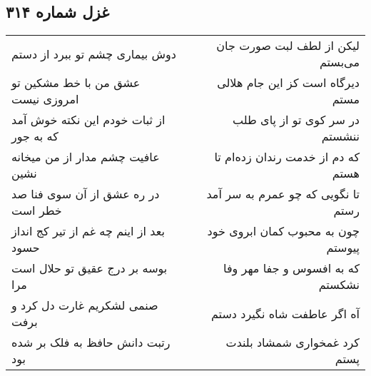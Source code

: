 \begin{center}
\section*{غزل شماره ۳۱۴}
\label{sec:sh314}
\begin{longtable}{l p{0.5cm} r}
دوش بیماری چشم تو ببرد از دستم
&&
لیکن از لطف لبت صورت جان می‌بستم
\\
عشق من با خط مشکین تو امروزی نیست
&&
دیرگاه است کز این جام هلالی مستم
\\
از ثبات خودم این نکته خوش آمد که به جور
&&
در سر کوی تو از پای طلب ننشستم
\\
عافیت چشم مدار از من میخانه نشین
&&
که دم از خدمت رندان زده‌ام تا هستم
\\
در ره عشق از آن سوی فنا صد خطر است
&&
تا نگویی که چو عمرم به سر آمد رستم
\\
بعد از اینم چه غم از تیر کج انداز حسود
&&
چون به محبوب کمان ابروی خود پیوستم
\\
بوسه بر درج عقیق تو حلال است مرا
&&
که به افسوس و جفا مهر وفا نشکستم
\\
صنمی لشکریم غارت دل کرد و برفت
&&
آه اگر عاطفت شاه نگیرد دستم
\\
رتبت دانش حافظ به فلک بر شده بود
&&
کرد غمخواری شمشاد بلندت پستم
\\
\end{longtable}
\end{center}
